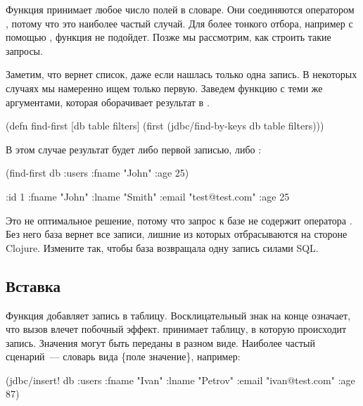 Функция принимает любое число полей в словаре. Они соединяются оператором , потому что это наиболее частый случай. Для более тонкого отбора, например с помощью , функция не подойдет. Позже мы рассмотрим, как строить такие запросы.

Заметим, что  вернет список, даже если нашлась только одна запись. В некоторых случаях мы намеренно ищем только первую. Заведем функцию  с теми же аргументами, которая оборачивает результат в .

\begin{english}
  \begin{clojure}
(defn find-first [db table filters]
  (first (jdbc/find-by-keys db table filters)))
  \end{clojure}
\end{english}

В этом случае результат будет либо первой записью, либо :

\begin{english}
  \begin{clojure}
(find-first db :users {:fname "John" :age 25})

{:id 1 :fname "John" :lname "Smith"
 :email "test@test.com" :age 25}
  \end{clojure}
\end{english}

Это не оптимальное решение, потому что запрос к базе не содержит оператора . Без него база вернет все записи, лишние из которых отбрасываются на стороне Clojure. Измените  так, чтобы база возвращала одну запись силами SQL.

\subsection{Вставка}

Функция  добавляет запись в таблицу. Восклицательный знак на конце означает, что вызов влечет побочный эффект.  принимает таблицу, в которую происходит запись. Значения могут быть переданы в разном виде. Наиболее частый сценарий~--- словарь вида \{поле \arr значение\}, например:

\begin{english}
  \begin{clojure}
(jdbc/insert! db :users
              {:fname "Ivan"
               :lname "Petrov"
               :email "ivan@test.com"
               :age 87})
  \end{clojure}
\end{english}

